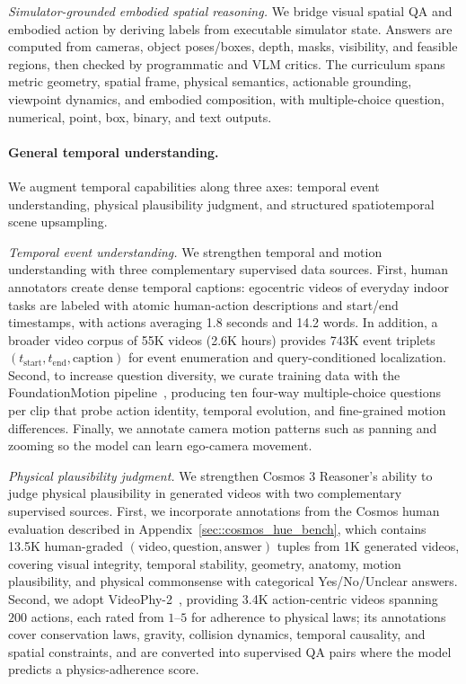\textit{Simulator-grounded embodied spatial reasoning.} We bridge visual spatial QA and embodied action by deriving labels from executable simulator state. 
Answers are computed from cameras, object poses/boxes, depth, masks, visibility, and feasible regions, then checked by programmatic and VLM critics. The curriculum spans metric geometry, spatial frame, physical semantics, actionable grounding, viewpoint dynamics, and embodied composition, with multiple-choice question, numerical, point, box, binary, and text outputs.

\paragraph{General temporal understanding.}
We augment temporal capabilities along three axes: temporal event understanding, physical plausibility judgment, and structured spatiotemporal scene upsampling.

\textit{Temporal event understanding.}
We strengthen temporal and motion understanding with three complementary supervised data sources. First, human annotators create dense temporal captions: egocentric videos of everyday indoor tasks are labeled with atomic human-action descriptions and start/end timestamps, with actions averaging 1.8 seconds and 14.2 words. In addition, a broader video corpus of 55K videos (2.6K hours) provides 743K event triplets $(t_{\text{start}}, t_{\text{end}}, \text{caption})$ for event enumeration and query-conditioned localization. Second, to increase question diversity, we curate training data with the FoundationMotion pipeline~\citep{gan2025foundationmotion}, producing ten four-way multiple-choice questions per clip that probe action identity, temporal evolution, and fine-grained motion differences. Finally, we annotate camera motion patterns such as panning and zooming so the model can learn ego-camera movement.

\textit{Physical plausibility judgment.}
We strengthen Cosmos 3 Reasoner's ability to judge physical plausibility in generated videos with two complementary supervised sources. 
First, we incorporate annotations from the Cosmos human evaluation described in Appendix~\ref{sec::cosmos_hue_bench}, which contains 13.5K human-graded $(\text{video}, \text{question}, \text{answer})$ tuples from 1K generated videos, covering visual integrity, temporal stability, geometry, anatomy, motion plausibility, and physical commonsense with categorical Yes/No/Unclear answers. Second, we adopt VideoPhy-2~\citep{bansal2025videophy}, providing 3.4K action-centric videos spanning $200$ actions, each rated from $1$--$5$ for adherence to physical laws; its annotations cover conservation laws, gravity, collision dynamics, temporal causality, and spatial constraints, and are converted into supervised QA pairs where the model predicts a physics-adherence score. 

